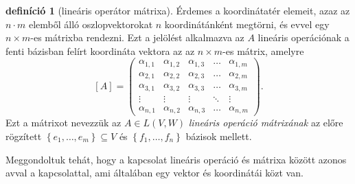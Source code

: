 \documentclass[9pt, a4paper, showtrims]{memoir}
\theoremstyle{plain}
\theoremstyle{remark}
\theoremstyle{definition}
\newtheorem{definition}[proposition]{definíció}
\begin{document}
\begin{definition}[lineáris operátor mátrixa]
	Érdemes a koordinátatér elemeit, azaz az $n\cdot m$ elemből álló oszlopvektorokat $n$ koordinátánként megtörni,
	és evvel egy $n\times m$-es mátrixba rendezni.
	Ezt a jelölést alkalmazva az $A$ lineáris operációnak a fenti bázisban felírt koordináta vektora az az
	$n\times m$-es mátrix,
	amelyre
	\[
		[A]=
		\begin{pmatrix}
			\alpha_{1,1} & \alpha_{1,2} & \alpha_{1,3} & \dots  & \alpha_{1,m} \\
			\alpha_{2,1} & \alpha_{2,2} & \alpha_{2,3} & \dots  & \alpha_{2,m} \\
			\alpha_{3,1} & \alpha_{3,2} & \alpha_{3,3} & \dots  & \alpha_{3,m} \\
			\vdots       & \vdots       & \vdots       & \ddots & \vdots       \\
			\alpha_{n,1} & \alpha_{n,2} & \alpha_{n,3} & \dots  & \alpha_{n,m}
		\end{pmatrix}.
	\]
	Ezt a mátrixot nevezzük az
	$A\in L\left( V,W \right)$ \emph{lineáris operáció mátrixának}
	az előre rögzített
	$\left\{e_1,\ldots,e_m  \right\}\subseteq V$ és $\left\{ f_1,\ldots,f_n \right\}$ bázisok mellett.
\end{definition}
Meggondoltuk tehát, hogy a kapcsolat lineáris operáció és mátrixa között azonos avval a kapcsolattal,
ami általában egy vektor és koordinátái közt van.
\end{document}
